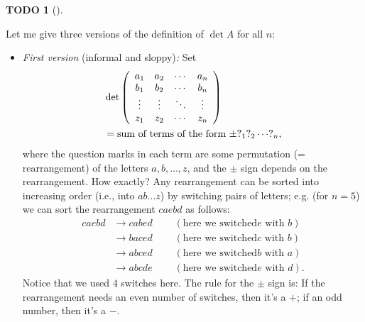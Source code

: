 \documentclass[numbers=enddot,12pt,final,onecolumn,notitlepage]{scrartcl}%
\theoremstyle{definition}
\newtheorem{quest}[theo]{TODO}
\newenvironment{todo}[1][]
{\begin{quest}[#1]\begin{leftbar}}
{\end{leftbar}\end{quest}}
\begin{document}
\begin{todo}
Let me give three versions of the definition of $\det A$ for all $n$:

\begin{itemize}
\item \textit{First version} (informal and sloppy)\textit{:} Set\textit{ }%
\begin{align*}
&  \det\left(
\begin{array}
[c]{cccc}%
a_{1} & a_{2} & \cdots & a_{n}\\
b_{1} & b_{2} & \cdots & b_{n}\\
\vdots & \vdots & \ddots & \vdots\\
z_{1} & z_{2} & \cdots & z_{n}%
\end{array}
\right) \\
&  =\text{sum of terms of the form }\pm?_{1}?_{2}\cdots?_{n},
\end{align*}
where the question marks in each term are some permutation (= rearrangement)
of the letters $a,b,\ldots,z$, and the $\pm$ sign depends on the
rearrangement. How exactly? Any rearrangement can be sorted into increasing
order (i.e., into $ab\ldots z$) by switching pairs of letters; e.g. (for
$n=5$) we can sort the rearrangement $caebd$ as follows:%
\begin{align*}
caebd  &  \rightarrow cabed\ \ \ \ \ \ \ \ \ \ \left(  \text{here we switched
}e\text{ with }b\right) \\
&  \rightarrow baced\ \ \ \ \ \ \ \ \ \ \left(  \text{here we switched
}c\text{ with }b\right) \\
&  \rightarrow abced\ \ \ \ \ \ \ \ \ \ \left(  \text{here we switched
}b\text{ with }a\right) \\
&  \rightarrow abcde\ \ \ \ \ \ \ \ \ \ \left(  \text{here we switched
}e\text{ with }d\right)  .
\end{align*}
Notice that we used $4$ switches here. The rule for the $\pm$ sign is: If the
rearrangement needs an even number of switches, then it's a $+$; if an odd
number, then it's a $-$.


\end{itemize}
\end{todo}
\end{document}
